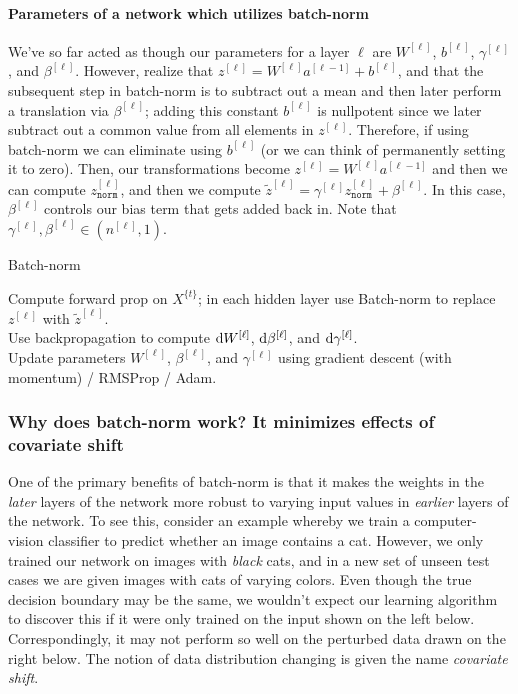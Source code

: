 \documentclass[12pt]{article}
\begin{document}
\paragraph{Parameters of a network which utilizes batch-norm} We've so far acted as though our parameters for a
layer $\ell$ are $W^{[\ell]}$, $b^{[\ell]}$, $\gamma^{[\ell]}$, and $\beta^{[\ell]}$. However, realize that 
$z^{[\ell]} = W^{[\ell]} a^{[\ell-1]} + b^{[\ell]}$, and that the subsequent step in batch-norm is to subtract out a mean and then later perform a translation via $\beta^{[\ell]}$; adding this constant $b^{[\ell]}$ is nullpotent since we later subtract out a common value from all elements in $z^{[\ell]}$. Therefore, if using batch-norm we can eliminate using $b^{[\ell]}$ (or we can think of permanently setting it to zero). Then, our transformations become 
$z^{[\ell]} = W^{[\ell]} a^{[\ell-1]}$ and then we can compute $z^{[\ell]}_{\texttt{norm}}$, and then we compute 
$\tilde z^{[\ell]} = \gamma^{[\ell]} z^{[\ell]}_{\texttt{norm}} + \beta^{[\ell]}$. In this case, $\beta^{[\ell]}$ controls our 
bias term that gets added back in. Note that $\gamma^{[\ell]}, \beta^{[\ell]} \in (n^{[\ell]}, 1)$.

\begin{algorithm}   \caption{Batch-norm}
   {
    Compute forward prop on $X^{\{t\}}$; in each hidden layer use Batch-norm to replace $z^{[\ell]}$ with $\tilde z^{[\ell]}$. \\
    Use backpropagation to compute $\operatorname{d}\!{W}^{[\ell]}$, $\operatorname{d}\!{\beta}^{[\ell]}$, and $\operatorname{d}\!{\gamma}^{[\ell]}$. \\
    Update parameters $W^{[\ell]}$, $\beta^{[\ell]}$, and $\gamma^{[\ell]}$ using {\small gradient descent (with momentum) / RMSProp / Adam}.
  } \end{algorithm}

\subsubsection{Why does batch-norm work? It minimizes effects of covariate shift}
One of the primary benefits of batch-norm is that it makes the weights in the \emph{later} layers of the network
more robust to varying input values in \emph{earlier} layers of the network.
To see this, consider an example whereby we train a computer-vision classifier to predict whether an image contains
a cat. However, we only trained our network on images with \emph{black} cats, and in a new set of unseen test cases
we are given images with cats of varying colors. Even though the true decision boundary may be the same, we wouldn't expect our learning algorithm to discover this if it were only trained on the input shown on the left below. Correspondingly, it may not perform so well on the perturbed data drawn on the right below. The notion of data distribution changing is given the name \emph{covariate shift}.
\end{document}
